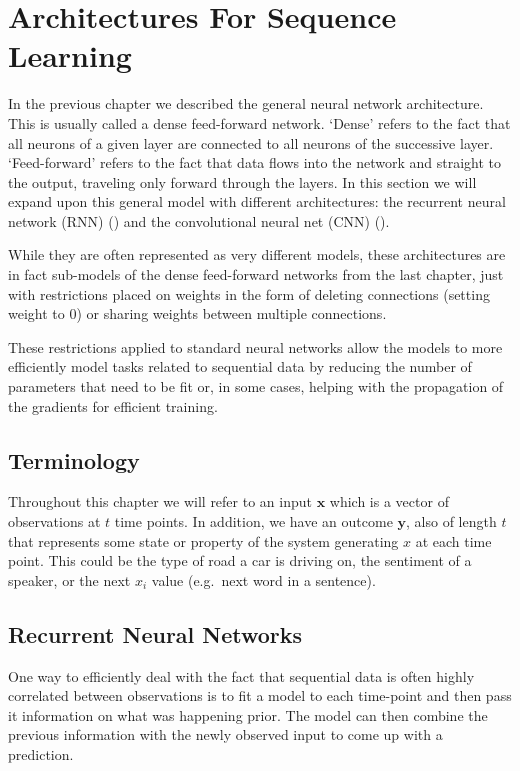 \documentclass[]{book}
\theoremstyle{definition}
\theoremstyle{definition}
\theoremstyle{definition}
\theoremstyle{remark}
\begin{document}
\chapter{Architectures For Sequence Learning}\label{architectures}

In the previous chapter we described the general neural network
architecture. This is usually called a dense feed-forward network.
`Dense' refers to the fact that all neurons of a given layer are
connected to all neurons of the successive layer. `Feed-forward' refers
to the fact that data flows into the network and straight to the output,
traveling only forward through the layers. In this section we will
expand upon this general model with different architectures: the
recurrent neural network (RNN) (\citet{rnn_intro}) and the convolutional
neural net (CNN) (\citet{cnn_intro}).

While they are often represented as very different models, these
architectures are in fact sub-models of the dense feed-forward networks
from the last chapter, just with restrictions placed on weights in the
form of deleting connections (setting weight to 0) or sharing weights
between multiple connections.

These restrictions applied to standard neural networks allow the models
to more efficiently model tasks related to sequential data by reducing
the number of parameters that need to be fit or, in some cases, helping
with the propagation of the gradients for efficient training.

\section{Terminology}\label{terminology-1}

Throughout this chapter we will refer to an input \(\mathbf{x}\) which
is a vector of observations at \(t\) time points. In addition, we have
an outcome \(\mathbf{y}\), also of length \(t\) that represents some
state or property of the system generating \(x\) at each time point.
This could be the type of road a car is driving on, the sentiment of a
speaker, or the next \(x_i\) value (e.g.~next word in a sentence).

\section{Recurrent Neural Networks}\label{recurrent-neural-networks}

One way to efficiently deal with the fact that sequential data is often
highly correlated between observations is to fit a model to each
time-point and then pass it information on what was happening prior. The
model can then combine the previous information with the newly observed
input to come up with a prediction.
\end{document}
